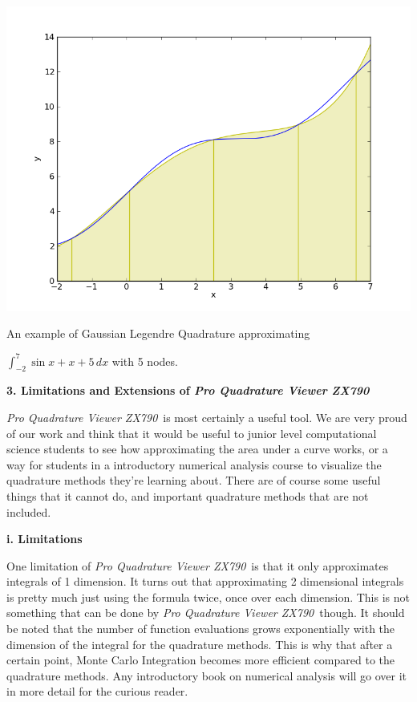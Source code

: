 \documentclass[12pt]{article}
\newcommand{\newLine}{\vspace{5mm}}
\newcommand{\appname}{\textit{Pro Quadrature Viewer ZX790}}
\newcommand{\nextsection}[1]{\newpage\noindent\Large\textbf{#1}\vspace{10mm}\normalsize}
\newcommand{\nextsubsection}[1]{\newLine \noindent \large \textbf{#1} \normalsize}
\newcommand{\integral}[3]{\text{$\int^{#2}_{#1} #3\,dx$}}
\begin{document}
\begin{center}
\includegraphics[scale=0.5]{sinXplusXgaussian.png}

\small An example of Gaussian Legendre Quadrature approximating 

$\integral{-2}{7}{\sin{x}+x+5}$ with 5 nodes. \normalsize
\end{center}

\nextsection{3. Limitations and Extensions of \appname}

\appname\, is most certainly a useful tool. We are very proud of our work and think that it would be useful to junior level computational science students to see how approximating the area under a curve works, or a way for students in a introductory numerical analysis course to visualize the quadrature methods they're learning about. There are of course some useful things that it cannot do, and important quadrature methods that are not included.

\nextsubsection{i. Limitations}

\newLine One limitation of \appname\,  is that it only approximates integrals of 1 dimension. It turns out that approximating 2 dimensional integrals is pretty much just using the formula twice, once over each dimension. This is not something that can be done by \appname\, though. It should be noted that the number of function evaluations grows exponentially with the dimension of the integral for the quadrature methods. This is why that after a certain point, Monte Carlo Integration becomes more efficient compared to the quadrature methods. Any introductory book on numerical analysis will go over it in more detail for the curious reader.
\end{document}
